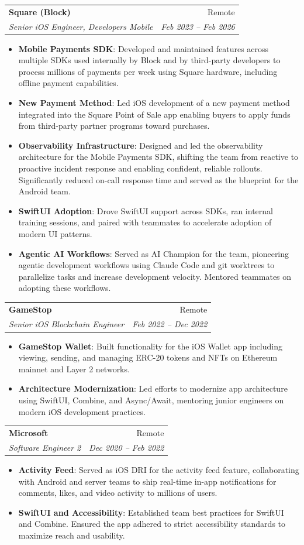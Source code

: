 \documentclass[letterpaper,20pt]{article}
\makeatletter
\newcommand{\resumeItem}[2]{%
  \item\small{%
    \textbf{#1}{: #2\vspace{-2pt}}%
  }%
}
\newcommand{\resumeSubheading}[4]{
  \vspace{-1pt}\item
    \begin{tabular*}{0.97\textwidth}{l@{\extracolsep{\fill}}r}
      \textbf{#1} & #2 \\
      \textit{#3} & \textit{#4} \\
    \end{tabular*}\vspace{-5pt}
}
\newcommand{\resumeItemListStart}{\begin{itemize}}
\newcommand{\resumeItemListEnd}{\end{itemize}}
\makeatother
\begin{document}
    \resumeSubheading{Square (Block)}{Remote}
    {Senior iOS Engineer, Developers Mobile}{Feb 2023 -- Feb 2026}
    \resumeItemListStart
        \resumeItem{Mobile Payments SDK}
          {Developed and maintained features across multiple SDKs used internally by Block and by third-party developers to process millions of payments per week using Square hardware, including offline payment capabilities.}
        \resumeItem{New Payment Method}
          {Led iOS development of a new payment method integrated into the Square Point of Sale app enabling buyers to apply funds from third-party partner programs toward purchases.}
        \resumeItem{Observability Infrastructure}
          {Designed and led the observability architecture for the Mobile Payments SDK, shifting the team from reactive to proactive incident response and enabling confident, reliable rollouts. Significantly reduced on-call response time and served as the blueprint for the Android team.}
        \resumeItem{SwiftUI Adoption}
          {Drove SwiftUI support across SDKs, ran internal training sessions, and paired with teammates to accelerate adoption of modern UI patterns.}
        \resumeItem{Agentic AI Workflows}
          {Served as AI Champion for the team, pioneering agentic development workflows using Claude Code and git worktrees to parallelize tasks and increase development velocity. Mentored teammates on adopting these workflows.}
    \resumeItemListEnd

    \resumeSubheading{GameStop}{Remote}
    {Senior iOS Blockchain Engineer}{Feb 2022 -- Dec 2022}
    \resumeItemListStart
        \resumeItem{GameStop Wallet}
          {Built functionality for the iOS Wallet app including viewing, sending, and managing ERC-20 tokens and NFTs on Ethereum mainnet and Layer 2 networks.}
        \resumeItem{Architecture Modernization}
          {Led efforts to modernize app architecture using SwiftUI, Combine, and Async/Await, mentoring junior engineers on modern iOS development practices.}
    \resumeItemListEnd

    \resumeSubheading{Microsoft}{Remote}
    {Software Engineer 2}{Dec 2020 -- Feb 2022}
    \resumeItemListStart
        \resumeItem{Activity Feed}
          {Served as iOS DRI for the activity feed feature, collaborating with Android and server teams to ship real-time in-app notifications for comments, likes, and video activity to millions of users.}
        \resumeItem{SwiftUI and Accessibility}
          {Established team best practices for SwiftUI and Combine. Ensured the app adhered to strict accessibility standards to maximize reach and usability.}
    \resumeItemListEnd
\end{document}
